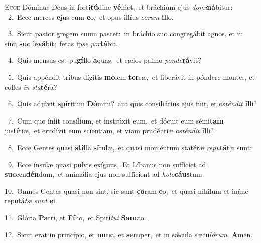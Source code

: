 \lettrine{\initial\textcolor{\initialcolor}{E}}{cce} Dóminus Deus in forti\-\textbf{tú}\-dine \textbf{vé}\-niet,~\star et bráchium ejus \textit{do}\-\textit{mi}\textbf{ná}bitur:\\
{\numbfont\textcolor{\numbcolor}{~2.}}~Ecce merces \textbf{e}\-jus cum \textbf{e}\-o,~\star et opus illíus \textit{co}\-\textit{ram} \textbf{il}\-lo.\par
{\numbfont\textcolor{\numbcolor}{~3.}}~Sicut pastor gregem suum pascet:~\dagger in bráchio suo congregábit agnos, et in sinu \textbf{su}\-o le\-\textbf{vá}\-bit;~\star fetas ip\textit{se} \textit{por}\-\textbf{tá}bit.\par
{\numbfont\textcolor{\numbcolor}{~4.}}~Quis mensus est pu\-\textbf{gíl}\-lo \textbf{a}\-quas,~\star et cælos palmo \textit{pon}\-\textit{de}\textbf{rá}vit?\par
{\numbfont\textcolor{\numbcolor}{~5.}}~Quis appéndit tribus dígitis \textbf{mo}\-lem \textbf{ter}\-ræ,~\star et liberávit in póndere montes, et colles \textit{in} \textit{sta}\-\textbf{té}ra?\par
{\numbfont\textcolor{\numbcolor}{~6.}}~Quis adjúvit \textbf{spí}\-ritum \textbf{Dó}\-mini?~\star aut quis consiliárius ejus fuit, et os\-\textit{tén}\-\textit{dit} \textbf{il}\-li?\par
{\numbfont\textcolor{\numbcolor}{~7.}}~Cum quo íniit consílium, et instrúxit eum,~\dagger et dócuit eum sémi\textbf{tam} jus\-\textbf{tí}\-tiæ,~\star et erudívit eum scíentiam, et viam prudéntiæ os\-\textit{tén}\-\textit{dit} \textbf{il}\-li?\par
{\numbfont\textcolor{\numbcolor}{~8.}}~Ecce Gentes quasi \textbf{stil}\-la \textbf{sí}\-tulæ,~\star et quasi moméntum statéræ \textit{re}\-\textit{pu}\textbf{tá}tæ sunt:\par
{\numbfont\textcolor{\numbcolor}{~9.}}~Ecce ínsulæ quasi pulvis exíguus.~\dagger Et Líbanus non suffíciet ad \textbf{suc}\-cen\-\textbf{dén}\-dum,~\star et animália ejus non suffícient ad \textit{ho}\-\textit{lo}\textbf{cáus}tum.\par
{\numbfont\textcolor{\numbcolor}{10.}}~Omnes Gentes quasi non sint, sic sunt \textbf{co}\-ram \textbf{e}\-o,~\star et quasi níhilum et ináne reputá\textit{tæ} \textit{sunt} \textbf{e}\-i.\par
{\numbfont\textcolor{\numbcolor}{11.}}~Glória \textbf{Pa}\-tri, et \textbf{Fí}\-lio,~\star et Spirí\-\textit{tu}\-\textit{i} \textbf{Sanc}\-to.\par
{\numbfont\textcolor{\numbcolor}{12.}}~Sicut erat in princípio, et \textbf{nunc}\-, et \textbf{sem}\-per,~\star et in sǽcula sæcu\-\textit{ló}\-\textit{rum}. \textbf{A}\-men.\par
